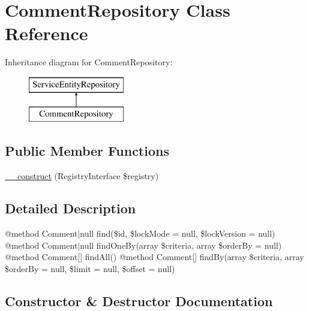 \hypertarget{class_app_1_1_repository_1_1_comment_repository}{}\section{Comment\+Repository Class Reference}
\label{class_app_1_1_repository_1_1_comment_repository}
Inheritance diagram for Comment\+Repository\+:\begin{figure}[H]
\begin{center}
\leavevmode
\includegraphics[height=2.000000cm]{class_app_1_1_repository_1_1_comment_repository}
\end{center}
\end{figure}
\subsection*{Public Member Functions}
\begin{DoxyCompactItemize}
\item 
\mbox{\hyperlink{class_app_1_1_repository_1_1_comment_repository_aadca7edd263e228921a1860bb6b9c252}{\+\_\+\+\_\+construct}} (Registry\+Interface \$registry)
\end{DoxyCompactItemize}


\subsection{Detailed Description}
@method Comment$\vert$null find(\$id, \$lock\+Mode = null, \$lock\+Version = null) @method Comment$\vert$null find\+One\+By(array \$criteria, array \$order\+By = null) @method Comment\mbox{[}\mbox{]} find\+All() @method Comment\mbox{[}\mbox{]} find\+By(array \$criteria, array \$order\+By = null, \$limit = null, \$offset = null) 

\subsection{Constructor \& Destructor Documentation}
\mbox{\label{class_app_1_1_repository_1_1_comment_repository_aadca7edd263e228921a1860bb6b9c252}} 
